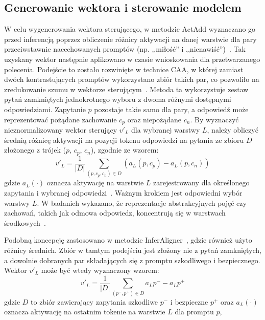 \subsection{Generowanie wektora i sterowanie modelem}
W celu wygenerowania wektora sterującego, w metodzie ActAdd wyznaczano go przed inferencją poprzez obliczenie różnicy aktywacji na danej warstwie dla pary przeciwstawnie nacechowanych promptów (np. ,,miłość'' i ,,nienawiść'')~\cite{turner2024steeringlanguagemodelsactivation}. Tak uzyskany wektor następnie aplikowano w czasie wnioskowania dla przetwarzanego polecenia.
Podejście to zostało rozwinięte w technice \gls{CAA}, w której zamiast dwóch kontrastujących promptów wykorzystano zbiór takich par, co pozwoliło na zredukowanie szumu w wektorze sterującym~\cite{panickssery2024steeringllama2contrastive}. Metoda ta wykorzystuje zestaw pytań zamkniętych jednokrotnego wyboru z dwoma różnymi dostępnymi odpowiedziami. Zapytanie $p$ pozostaje takie samo dla pary, a odpowiedź może reprezentować pożądane zachowanie $c_p$ oraz niepożądane $c_n$. By wyznaczyć nieznormalizowany wektor sterujący $v'_L$ dla wybranej warstwy $L$, należy obliczyć średnią różnicę aktywacji na pozycji tokenu odpowiedzi na pytania ze zbioru $D$ złożonego z trójek ($p$, $c_p$, $c_n$), zgodnie ze wzorem:
\begin{equation}
    v'_L = \frac{1}{|D|} \sum_{(p, c_p, c_n) \in D} (a_L(p, c_p) - a_L(p, c_n))
\end{equation}
gdzie $a_L(\cdot)$ oznacza aktywację na warstwie $L$ zarejestrowany dla określonego zapytania i wybranej odpowiedzi~\cite{panickssery2024steeringllama2contrastive}.
Ważnym krokiem jest odpowiedni wybór warstwy $L$. W badanich wykazano, że reprezentacje abstrakcyjnych pojęć czy zachowań, takich jak odmowa odpowiedz, koncentrują się w warstwach środkowych~\cite{zou2025representationengineeringtopdownapproach, panickssery2024steeringllama2contrastive}.

Podobną koncepcję zastosowano w metodzie InferAligner~\cite{wang2024inferalignerinferencetimealignmentharmlessness}, gdzie również użyto różnicy średnich. Zbiór w tamtym podejściu jest złożony nie z pytań zamkniętych, a dowolnie dobranych par składających się z promptu szkodliwego i bezpiecznego. Wektor $v'_L$ może być wtedy wyznaczony wzorem:
\begin{equation}
    v'_L = \frac{1}{|D|} \sum_{(p^-, p^+) \in D} a_L p^- - a_L p^+
\end{equation}
gdzie $D$ to zbiór zawierający zapytania szkodliwe $p^-$ i bezpieczne $p^+$ oraz $a_L(\cdot)$ oznacza aktywację na ostatnim tokenie na warstwie $L$ dla promptu $p$,

